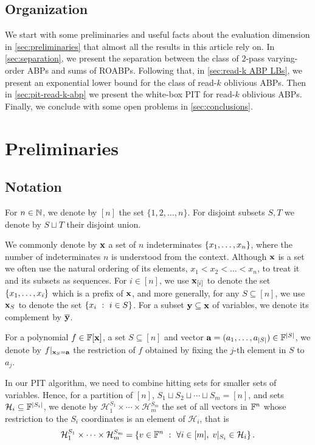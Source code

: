 \documentclass[11pt]{article}
\newcommand{\exi}{\vecx_{[i]}}
\newcommand{\cH}{\mathcal{H}}
\begin{document}
\subsection{Organization}

We start with some preliminaries and useful facts about the evaluation dimension in \autoref{sec:preliminaries} that almost all the results in this article rely on.
In \autoref{sec:separation}, we present the separation between the class of $2$-pass varying-order ABPs and sums of ROABPs.
Following that, in \autoref{sec:read-k ABP LBs}, we present an exponential lower bound for the class of read-$k$ oblivious ABPs.
Then in \autoref{sec:pit-read-k-abp} we present the white-box PIT for read-$k$ oblivious ABPs.
Finally, we conclude with some open problems in \autoref{sec:conclusions}.




\section{Preliminaries}\label{sec:preliminaries}

\subsection{Notation}
For $n \in \N$, we denote by $[n]$ the set $\{1, 2, \ldots, n\}$.  For disjoint subsets $S, T$ we denote by $S \sqcup T$ their disjoint union.

We commonly denote by $\mathbf{x}$ a set of $n$ indeterminates $\left\{ x_1, \ldots, x_n \right\}$, where the number of indeterminates $n$ is understood from the context.  Although $\mathbf{x}$ is a set we often use the natural ordering of its elements, $x_1 < x_2 < \ldots < x_n$, to treat it and its subsets as sequences.  For $i \in [n]$, we use $\exi$ to denote the set $\left\{ x_1, \ldots, x_i \right\}$ which is a prefix of $\mathbf{x}$, and more generally, for any $S \subseteq [n]$, we use $\mathbf{x}_S$ to denote the set $\left\{  x_i \ : \ i \in S \right\}$.  For a subset $\mathbf{y} \subseteq \mathbf{x}$ of variables, we denote its complement by $\overline{\mathbf{y}}$. 

For a polynomial $f \in \F[\vecx]$, a set $S \subseteq [n]$ and vector $\veca = (a_1, \ldots, a_{|S|}) \in \F^{|S|}$, we denote by $f|_{\mathbf{x}_S = \mathbf{a}}$ the restriction of $f$ obtained by fixing the $j$-th element in $S$ to $a_j$.

In our PIT algorithm, we need to combine hitting sets for smaller sets of variables. Hence, for a partition of $[n]$, $S_1\sqcup S_2\sqcup \cdots \sqcup S_m = [n]$, and sets $\cH_i \subseteq \F^{|S_i|}$, we denote by $\cH_1^{S_1}\times \cdots \times \cH_m^{S_m}$ the set of all vectors in $\F^n$ whose restriction to the $S_i$ coordinates is an element of $\cH_i$, that is
\[
\cH_1^{S_1}\times \cdots \times \cH_m^{S_m} = \setdef{ v \in\F^n}{\forall i\in [m], \; v|_{S_i} \in \cH_i}.
\]
\end{document}

